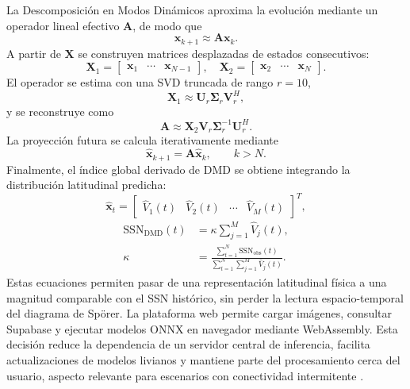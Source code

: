 \documentclass[a4paper,twocolumn,11pt]{article}
\begin{document}
La Descomposición en Modos Dinámicos aproxima la evolución mediante un operador lineal efectivo $\mathbf{A}$, de modo que
\begin{equation}
\mathbf{x}_{k+1}\approx\mathbf{A}\mathbf{x}_{k}.
\end{equation}
A partir de $\mathbf{X}$ se construyen matrices desplazadas de estados consecutivos:
\begin{equation}
\mathbf{X}_1=\begin{bmatrix}\mathbf{x}_1&\cdots&\mathbf{x}_{N-1}\end{bmatrix},\quad
\mathbf{X}_2=\begin{bmatrix}\mathbf{x}_2&\cdots&\mathbf{x}_{N}\end{bmatrix}.
\end{equation}
El operador se estima con una SVD truncada de rango $r=10$,
\begin{equation}
\mathbf{X}_1\approx\mathbf{U}_r\boldsymbol{\Sigma}_r\mathbf{V}_r^{H},
\end{equation}
y se reconstruye como
\begin{equation}
\mathbf{A}\approx\mathbf{X}_2\mathbf{V}_r\boldsymbol{\Sigma}_r^{-1}\mathbf{U}_r^{H}.
\end{equation}
La proyección futura se calcula iterativamente mediante
\begin{equation}
\widehat{\mathbf{x}}_{k+1}=\mathbf{A}\widehat{\mathbf{x}}_k, \qquad k>N.
\end{equation}
Finalmente, el índice global derivado de DMD se obtiene integrando la distribución latitudinal predicha:
\begin{equation}
\widehat{\mathbf{x}}_t=\begin{bmatrix}\widehat{V}_1(t)&\widehat{V}_2(t)&\cdots&\widehat{V}_M(t)\end{bmatrix}^{T},
\end{equation}
\begin{align}
\mathrm{SSN}_{\mathrm{DMD}}(t)&=\kappa\sum_{j=1}^{M}\widehat{V}_j(t),\\
\kappa&=\frac{\sum_{t=1}^{N}\mathrm{SSN}_{\mathrm{obs}}(t)}
{\sum_{t=1}^{N}\sum_{j=1}^{M}\widehat{V}_j(t)}.
\end{align}
Estas ecuaciones permiten pasar de una representación latitudinal física a una magnitud comparable con el SSN histórico, sin perder la lectura espacio-temporal del diagrama de Spörer. La plataforma web permite cargar imágenes, consultar Supabase y ejecutar modelos ONNX en navegador mediante WebAssembly. Esta decisión reduce la dependencia de un servidor central de inferencia, facilita actualizaciones de modelos livianos y mantiene parte del procesamiento cerca del usuario, aspecto relevante para escenarios con conectividad intermitente \citep{schmid2010dmd,kutz2016dmd,hathaway2015solarcycle,woo2023convnextv2,ultralyticsYOLO26,camporeale2019ml}.
\end{document}

